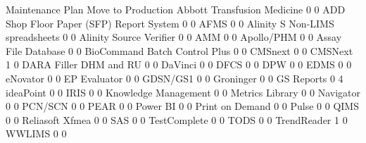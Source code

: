\documentclass{article}
\begin{document}
\begin{Schunk}
\begin{Soutput}
                                           Maintenance Plan Move to Production
  Abbott Transfusion Medicine                             0                  0
  ADD Shop Floor Paper (SFP) Report System                0                  0
  AFMS                                                    0                  0
  Alinity S Non-LIMS spreadsheets                         0                  0
  Alinity Source Verifier                                 0                  0
  AMM                                                     0                  0
  Apollo/PHM                                              0                  0
  Assay File Database                                     0                  0
  BioCommand Batch Control Plus                           0                  0
  CMSnext                                                 0                  0
  CMSNext                                                 1                  0
  DARA Filler DHM and RU                                  0                  0
  DaVinci                                                 0                  0
  DFCS                                                    0                  0
  DPW                                                     0                  0
  EDMS                                                    0                  0
  eNovator                                                0                  0
  EP Evaluator                                            0                  0
  GDSN/GS1                                                0                  0
  Groninger                                               0                  0
  GS Reports                                              0                  4
  ideaPoint                                               0                  0
  IRIS                                                    0                  0
  Knowledge Management                                    0                  0
  Metrics Library                                         0                  0
  Navigator                                               0                  0
  PCN/SCN                                                 0                  0
  PEAR                                                    0                  0
  Power BI                                                0                  0
  Print on Demand                                         0                  0
  Pulse                                                   0                  0
  QIMS                                                    0                  0
  Reliasoft Xfmea                                         0                  0
  SAS                                                     0                  0
  TestComplete                                            0                  0
  TODS                                                    0                  0
  TrendReader                                             1                  0
  WWLIMS                                                  0                  0


\end{Soutput}
\end{Schunk}
\end{document}
